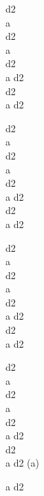 \begin{chord}
    d2\\
    a\\
    d2\\
    a\\
    d2\\
    a d2\\
    d2\\
    a d2

    d2\\
    a\\
    d2\\
    a\\
    d2\\
    a d2\\
    d2\\
    a d2

    d2\\
    a\\
    d2\\
    a\\
    d2\\
    a d2\\
    d2\\
    a d2

    d2\\
    a\\
    d2\\
    a\\
    d2\\
    a d2\\
    d2\\
    a d2 (a)

    a d2
\end{chord}